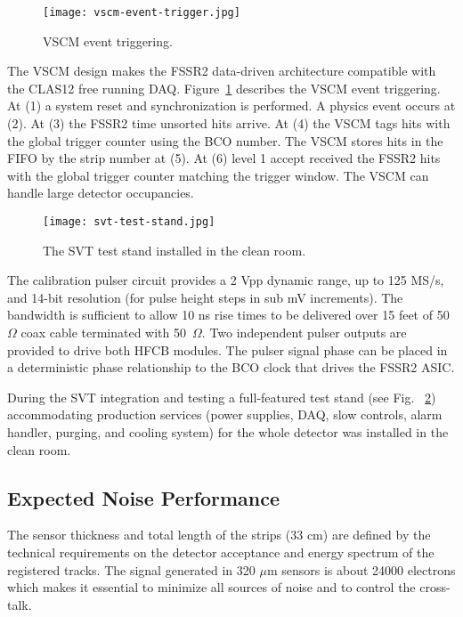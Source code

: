 \begin{figure}[hbt] 
\centering 
\texttt{[image: vscm-event-trigger.jpg]}
\caption{VSCM event triggering.}
\label{fig:vscm-event-trigger}
\end{figure}

The VSCM design makes the FSSR2 data-driven architecture compatible with the CLAS12 free running DAQ. Figure~\ref{fig:vscm-event-trigger} describes the VSCM event triggering. At (1) a system reset and synchronization is performed. A physics event occurs at (2). At (3) the FSSR2 time unsorted hits arrive. At (4) the VSCM tags hits with the global trigger counter using the BCO number. The VSCM stores hits in the FIFO by the strip number at (5). At (6) level 1 accept received the FSSR2 hits with the global trigger counter matching the trigger window. The VSCM can handle large detector occupancies.

\begin{figure}[hbt] 
\centering 
\texttt{[image: svt-test-stand.jpg]}
\caption{The SVT test stand installed in the clean room.}
\label{fig:svt-test-stand}
\end{figure}

The calibration pulser circuit provides a 2 Vpp dynamic range, up to 125 MS/s, and 14-bit resolution (for pulse height steps in sub mV increments). The bandwidth is sufficient to allow 10 ns rise times to be delivered over 15 feet of 50~$\Omega$ coax cable terminated with 50~$\Omega$. Two independent pulser outputs are provided to drive both HFCB modules. The pulser signal phase can be placed in a deterministic phase relationship to the BCO clock that drives the FSSR2 ASIC. 

During the SVT integration and testing a full-featured test stand (see Fig. ~\ref{fig:svt-test-stand}) accommodating production services (power supplies, DAQ, slow controls, alarm handler, purging, and cooling system) for the whole detector was installed in the clean room.

\subsection{Expected Noise Performance}

The sensor thickness and total length of the strips (33 cm) are defined by the technical requirements on the detector acceptance and energy spectrum of the registered tracks. The signal generated in 320 $\mu$m sensors is about 24000 electrons which makes it essential to minimize all sources of noise and to control the cross-talk. 

